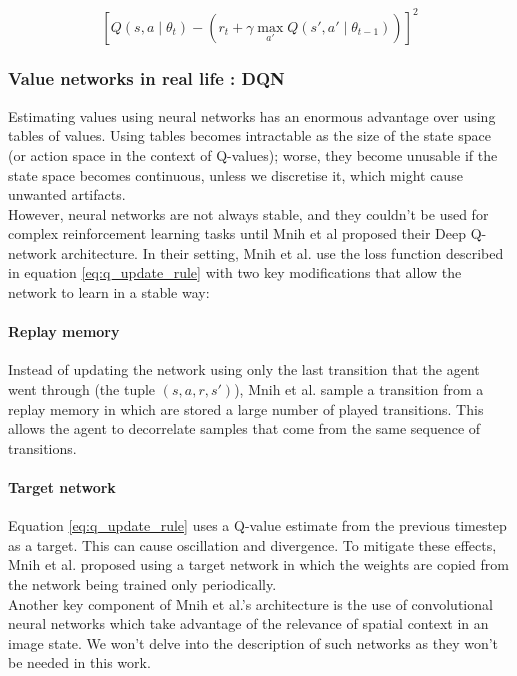 \begin{equation}
	\label{eq:q_update_rule}
\left[Q(s, a\mid \theta_t) - 
	\left( r_t + \gamma \max\limits_{a'} Q(s', a'\mid \theta_{t-1}) \right) \right]^2
\end{equation}

\subsubsection{Value networks in real life : DQN}
Estimating values using neural networks has an enormous advantage over using
tables of values. Using tables becomes intractable as the size of the state
space (or action space in the context of Q-values); worse, they become
unusable if the state space becomes continuous, unless we discretise it,
which might cause unwanted artifacts.\\

However, neural networks are not always stable, and they couldn't be used
for complex reinforcement learning tasks until Mnih et al \cite{dqn, dqn_nature}
proposed their Deep Q-network architecture. In their setting, Mnih et al. 
use the loss function described in equation \ref{eq:q_update_rule} with two
key modifications that allow the network to learn in a stable way:

\paragraph{Replay memory} Instead of updating the network using only the 
last transition that the agent went through (the tuple $(s, a, r, s')$), 
Mnih et al. sample a transition from a replay memory in which are stored
a large number of played transitions. This allows the agent to decorrelate
samples that come from the same sequence of transitions.

\paragraph{Target network} Equation \ref{eq:q_update_rule} uses a Q-value
estimate from the previous timestep as a target. This can cause oscillation
and divergence. To mitigate these effects, Mnih et al. proposed using a target
network in which the weights are copied from the network being trained 
only periodically.\\

Another key component of Mnih et al.'s architecture is the use of
convolutional neural networks \cite{convnets} which take advantage of the
relevance of spatial context in an image state. We won't delve into the
description of such networks as they won't be needed in this work.

